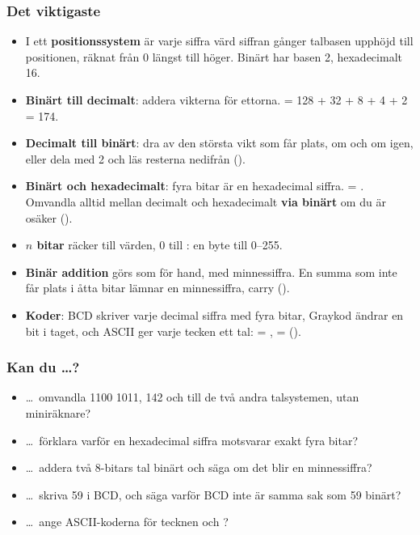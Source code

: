 \subsubsection{Det viktigaste}
\begin{itemize}
  \item I ett \textbf{positionssystem} är varje siffra värd siffran gånger talbasen upphöjd till
    positionen, räknat från 0 längst till höger. Binärt har basen 2, hexadecimalt 16.
  \item \textbf{Binärt till decimalt}: addera vikterna för ettorna.  = 128 + 32 + 8
    + 4 + 2 = 174.
  \item \textbf{Decimalt till binärt}: dra av den största vikt som får plats, om och om igen, eller
    dela med 2 och läs resterna nedifrån ().
  \item \textbf{Binärt och hexadecimalt}: fyra bitar är en hexadecimal siffra.  =
    . Omvandla alltid mellan decimalt och hexadecimalt \textbf{via binärt} om du är
    osäker ().
  \item \textbf{$n$ bitar} räcker till  värden, 0 till : en byte till
    0--255.
  \item \textbf{Binär addition} görs som för hand, med minnessiffra. En summa som inte får plats i
    åtta bitar lämnar en minnessiffra, carry ().
  \item \textbf{Koder}: BCD skriver varje decimal siffra med fyra bitar, Graykod ändrar en bit i
    taget, och ASCII ger varje tecken ett tal:  = ,  = 
    ().
\end{itemize}

\subsubsection{Kan du \dots?}
\begin{itemize}
  \item \dots\ omvandla 1100 1011, 142 och  till de två andra talsystemen, utan
    miniräknare?
  \item \dots\ förklara varför en hexadecimal siffra motsvarar exakt fyra bitar?
  \item \dots\ addera två 8-bitars tal binärt och säga om det blir en minnessiffra?
  \item \dots\ skriva 59 i BCD, och säga varför BCD inte är samma sak som 59 binärt?
  \item \dots\ ange ASCII-koderna för tecknen  och ?
\end{itemize}


